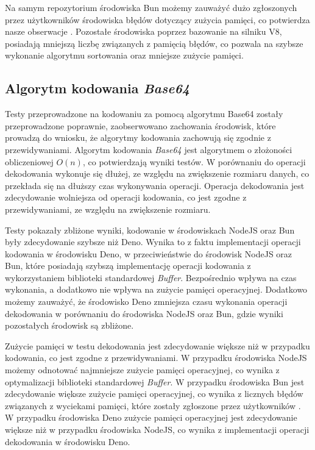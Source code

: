 Na samym repozytorium środowiska Bun możemy zauważyć dużo zgłoszonych przez użytkowników środowiska błędów dotyczący zużycia pamięci, co potwierdza nasze obserwacje \cite{bun_memory}. Pozostałe środowiska poprzez bazowanie na silniku V8, posiadają mniejszą liczbę związanych z pamięcią błędów, co pozwala na szybsze wykonanie algorytmu sortowania oraz mniejsze zużycie pamięci.

\subsection{Algorytm kodowania \textit{Base64}}
Testy przeprowadzone na kodowaniu za pomocą algorytmu Base64 zostały przeprowadzone poprawnie, zaobserwowano zachowania środowisk, które prowadzą do wniosku, że algorytmy kodowania zachowują się zgodnie z przewidywaniami. Algorytm kodowania \textit{Base64} jest algorytmem o złożoności obliczeniowej $O(n)$, co potwierdzają wyniki testów. W porównaniu do operacji dekodowania wykonuje się dłużej, ze względu na zwiększenie rozmiaru danych, co przekłada się na dłuższy czas wykonywania operacji. Operacja dekodowania jest zdecydowanie wolniejsza od operacji kodowania, co jest zgodne z przewidywaniami, ze względu na zwiększenie rozmiaru.

Testy pokazały zbliżone wyniki, kodowanie w środowiskach NodeJS oraz Bun były zdecydowanie szybsze niż Deno. Wynika to z faktu implementacji operacji kodowania w środowisku Deno, w przeciwieństwie do środowisk NodeJS oraz Bun, które posiadają szybszą implementację operacji kodowania z wykorzystaniem biblioteki standardowej \textit{Buffer}. Bezpośrednio wpływa na czas wykonania, a dodatkowo nie wpływa na zużycie pamięci operacyjnej. Dodatkowo możemy zauważyć, że środowisko Deno zmniejsza czasu wykonania operacji dekodowania w porównaniu do środowiska NodeJS oraz Bun, gdzie wyniki pozostałych środowisk są zbliżone.

Zużycie pamięci w testu dekodowania jest zdecydowanie większe niż w przypadku kodowania, co jest zgodne z przewidywaniami. W przypadku środowiska NodeJS możemy odnotować najmniejsze zużycie pamięci operacyjnej, co wynika z optymalizacji biblioteki standardowej \textit{Buffer}. W przypadku środowiska Bun jest zdecydowanie większe zużycie pamięci operacyjnej, co wynika z licznych błędów związanych z wyciekami pamięci, które zostały zgłoszone przez użytkowników \cite{bun_memory}. W przypadku środowiska Deno zużycie pamięci operacyjnej jest zdecydowanie większe niż w przypadku środowiska NodeJS, co wynika z implementacji operacji dekodowania w środowisku Deno.

